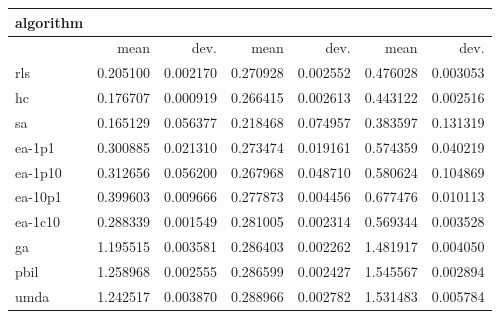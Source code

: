 \begin{tabular}{@{}l*{6}{>{{}}N{1}{2}}@{}}
\toprule
{algorithm} &  &  &  \\
\midrule
& {mean} & {dev.} & {mean} & {dev.} & {mean} & {dev.} \\
\midrule
rls & 0.205100 & 0.002170 & 0.270928 & 0.002552 & 0.476028 & 0.003053 \\
 hc & 0.176707 & 0.000919 & 0.266415 & 0.002613 & 0.443122 & 0.002516 \\
 sa & 0.165129 & 0.056377 & 0.218468 & 0.074957 & 0.383597 & 0.131319 \\
 ea-1p1 & 0.300885 & 0.021310 & 0.273474 & 0.019161 & 0.574359 & 0.040219 \\
 ea-1p10 & 0.312656 & 0.056200 & 0.267968 & 0.048710 & 0.580624 & 0.104869 \\
 ea-10p1 & 0.399603 & 0.009666 & 0.277873 & 0.004456 & 0.677476 & 0.010113 \\
 ea-1c10 & 0.288339 & 0.001549 & 0.281005 & 0.002314 & 0.569344 & 0.003528 \\
 ga & 1.195515 & 0.003581 & 0.286403 & 0.002262 & 1.481917 & 0.004050 \\
 pbil & 1.258968 & 0.002555 & 0.286599 & 0.002427 & 1.545567 & 0.002894 \\
 umda & 1.242517 & 0.003870 & 0.288966 & 0.002782 & 1.531483 & 0.005784 \\
 \bottomrule
\end{tabular}
